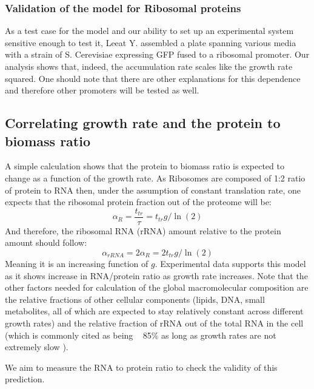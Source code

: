 \documentclass{report}
\begin{document}
\subsubsection{Validation of the model for Ribosomal proteins}
As a test case for the model and our ability to set up an experimental system sensitive enough to test it, Leeat Y. assembled a plate spanning various media with a strain of S. Cerevisiae expressing GFP fused to a ribosomal promoter.
Our analysis shows that, indeed, the accumulation rate scales like the growth rate squared.
One should note that there are other explanations for this dependence and therefore other promoters will be tested as well.
\subsection{Correlating growth rate and the protein to biomass ratio}
A simple calculation shows that the protein to biomass ratio is expected to change as a function of the growth rate.
As Ribosomes are composed of 1:2 ratio of protein to RNA then, under the assumption of constant translation rate, one expects that the ribosomal protein fraction out of the proteome will be:
\[\alpha_R=\frac{t_{tr}}{\tau}=t_{tr}g/\ln(2)\]
And therefore, the ribosomal RNA (rRNA) amount relative to the protein amount should follow:
\[\alpha_{rRNA}=2\alpha_R=2t_{tr}g/\ln(2)\]
Meaning it is an increasing function of $g$.
Experimental data supports this model as it shows increase in RNA/protein ratio as growth rate increases.
Note that the other factors needed for calculation of the global macromolecular composition are the relative fractions of other cellular components (lipids, DNA, small metabolites, all of which are expected to stay relatively constant across different growth rates) and the relative fraction of rRNA out of the total RNA in the cell (which is commonly cited as being ~ 85\% as long as growth rates are not extremely slow \cite{Bremer1987,goldberger1979biological}).

We aim to measure the RNA to protein ratio to check the validity of this prediction.


\end{document}
